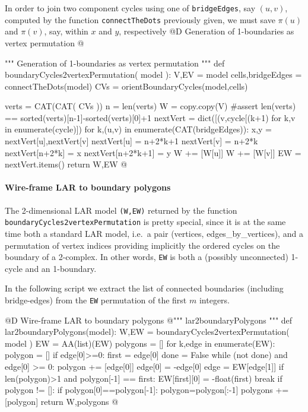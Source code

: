 \documentclass[11pt,oneside]{article}    %
\begin{document}
In order to join two component cycles using one of \texttt{bridgeEdges}, say $(u,v)$, computed by the function \texttt{connectTheDots} previously given, we must save $\pi(u)$ and $\pi(v)$, say, within $x$ and $y$, respectively
@D Generation of 1-boundaries as vertex permutation 
@{""" Generation of 1-boundaries as vertex permutation """
def boundaryCycles2vertexPermutation( model ):
    V,EV = model
    cells,bridgeEdges = connectTheDots(model)
    CVs = orientBoundaryCycles(model,cells)
    
    verts = CAT(CAT( CVs ))
    n = len(verts)
    W = copy.copy(V)
    #assert len(verts) == sorted(verts)[n-1]-sorted(verts)[0]+1
    nextVert = dict([(v,cycle[(k+1)%
                   for k,v in enumerate(cycle)])
    for k,(u,v) in enumerate(CAT(bridgeEdges)):
        x,y = nextVert[u],nextVert[v]
        nextVert[u] = n+2*k+1
        nextVert[v] = n+2*k      
        nextVert[n+2*k] = x
        nextVert[n+2*k+1] = y
        W += [W[u]]
        W += [W[v]]
        EW = nextVert.items()
    return W,EW
@}

\paragraph{Wire-frame LAR to boundary polygons}
The 2-dimensional LAR model \texttt{(W,EW)} returned by the function \texttt{boundaryCycles2vertexPermutation} is pretty special, since it is at the same time both a standard LAR model, i.e.~a pair (vertices, edges\_by\_vertices), and a permutation of vertex indices providing implicitly the ordered cycles on the boundary of a 2-complex. In other words, \texttt{EW} is both a (possibly unconnected) 1-cycle and an 1-boundary.

In the following script we extract the list of connected boundaries (including bridge-edges) from the \texttt{EW} permutation of the first $m$ integers.

@D Wire-frame LAR to boundary polygons 
@{""" lar2boundaryPolygons """
def lar2boundaryPolygons(model):
    W,EW = boundaryCycles2vertexPermutation( model )
    EW = AA(list)(EW)
    polygons = []
    for k,edge in enumerate(EW):
        polygon = []
        if edge[0]>=0:
            first = edge[0]
            done = False
        while (not done) and edge[0] >= 0:
            polygon += [edge[0]]
            edge[0] = -edge[0]
            edge = EW[edge[1]]
            if len(polygon)>1 and polygon[-1] == first: 
                EW[first][0] = -float(first)
                break 
        if polygon != []: 
            if polygon[0]==polygon[-1]: polygon=polygon[:-1]
            polygons += [polygon]
    return W,polygons
@}       
\end{document}
